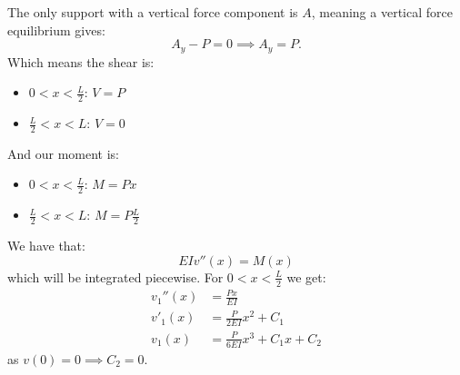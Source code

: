 \begin{derivation}
  The only support with a vertical force component is $A$, meaning a vertical force equilibrium gives:
  \begin{equation*}
    A_y - P = 0 \implies A_y = P
  .\end{equation*}
  Which means the shear is:
  \begin{itemize}
    \item $0 < x < \frac{L}{2}$: $V = P$
    \item $\frac{L}{2} < x < L$: $V = 0$
  \end{itemize}
  And our moment is:
  \begin{itemize}
    \item $0 < x < \frac{L}{2}$: $M = Px$
    \item $\frac{L}{2}< x < L$: $M = P \frac{L}{2}$
  \end{itemize}
  
  We have that:
  \begin{equation*}
    EI v''(x) = M(x)
  \end{equation*}
  which will be integrated piecewise.
  For $0 < x < \frac{L}{2}$ we get:
  \begin{align*}
    v_1''(x) &= \frac{Px}{EI} \\
    v'_1 (x) &= \frac{P}{2EI}x^2 + C_1 \\
    v_1 (x) &= \frac{P}{6EI}x^3 + C_1 x + C_2
  \end{align*}
  as $v(0) = 0 \implies C_2 = 0$.


\end{derivation}
